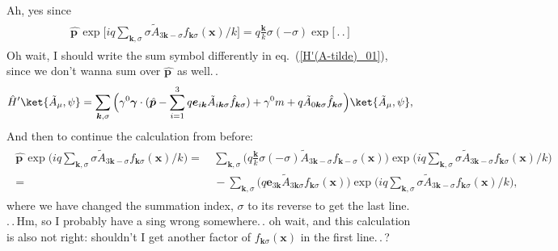 \documentclass{report}
\begin{document}
Ah, yes since
\begin{align}
\begin{aligned}
\hat{\boldsymbol p\,}\! 
	\exp\Big[
		i q \sum_{\boldsymbol{k}, \sigma} \sigma \tilde A_{3\boldsymbol{k}-\sigma} 
		f_{\boldsymbol{k}\sigma}(\boldsymbol{x}) / k
	\Big] =
	q\frac{\boldsymbol{k}}{k}\sigma (-\sigma)
	\exp\Big[
			\,.\,.\,
		\Big]
\end{aligned}
\end{align}
Oh wait, I should write the sum symbol differently in eq.\ (\ref{H'(A-tilde)_01}), since we don't wanna sum over $\hat{\boldsymbol p\,}\!$ as well.\,.
\begin{align}
	\hat H' \ket{\tilde A_\mu, \psi} = 
		\sum_{\boldsymbol{k}, \sigma}\Big(
			\gamma^0 \boldsymbol \gamma \cdot (
				\hat{\boldsymbol p\,}\! - 
					\sum_{i=1}^{3} 
					q \boldsymbol{e}_{i\boldsymbol{k}} 
					\tilde A_{i\boldsymbol{k}\sigma}
					\hat f_{\boldsymbol{k}\sigma}
			) +
			\gamma^0 m + q \tilde A_{0\boldsymbol{k}\sigma}
			\hat f_{\boldsymbol{k}\sigma}
		\Big) 
		\ket{\tilde A_\mu, \psi},
\end{align}
And then to continue the calculation from before:
\begin{align}
\begin{aligned}
	\hat{\boldsymbol p\,}\! 
	\exp\Big(
		i q \sum_{\boldsymbol{k}, \sigma} \sigma \tilde A_{3\boldsymbol{k}-\sigma} 
		f_{\boldsymbol{k}\sigma}(\boldsymbol{x}) / k
	\Big) =&\,
	\sum_{\boldsymbol{k}, \sigma} \Big(
		q\frac{\boldsymbol{k}}{k}\sigma (-\sigma)
		\tilde A_{3\boldsymbol{k} -\sigma} 
		f_{\boldsymbol{k} -\sigma}(\boldsymbol{x})
	\Big)
	\exp\Big(
			i q \sum_{\boldsymbol{k}, \sigma} \sigma \tilde A_{3\boldsymbol{k}-\sigma} 
			f_{\boldsymbol{k}\sigma}(\boldsymbol{x}) / k
		\Big)
	\\=&\,
	-\sum_{\boldsymbol{k}, \sigma} \Big(
		q \boldsymbol{e}_{3\boldsymbol{k}}
		\tilde A_{3\boldsymbol{k} \sigma} 
		f_{\boldsymbol{k} \sigma}(\boldsymbol{x})
	\Big)
	\exp\Big(
			i q \sum_{\boldsymbol{k}, \sigma} \sigma \tilde A_{3\boldsymbol{k}-\sigma} 
			f_{\boldsymbol{k}\sigma}(\boldsymbol{x}) / k
		\Big),
\end{aligned}
\end{align}
where we have changed the summation index, $\sigma$ to its reverse to get the last line. 
.\,.\,Hm, so I probably have a sing wrong somewhere.\,. oh wait, and this calculation is also not right: shouldn't I get another factor of $f_{\boldsymbol{k}\sigma}(\boldsymbol{x})$ in the first line.\,.\,? 
\end{document}

